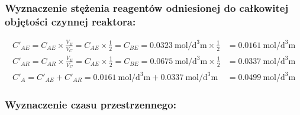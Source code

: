 \documentclass[11pt]{article}
\begin{document}
\subsubsection{Wyznaczenie stężenia reagentów odniesionej do całkowitej objętości czynnej reaktora:}
\begin{align}
{C'}_{AE}=C_{AE}\times\frac{V_E}{V_C}=C_{AE}\times\frac{1}{2}=C_{BE}=\SI{0.0323}{\mole\per\cubic\deci\metre}\times\frac{1}{2}&=\SI{0.0161}{\mole\per\cubic\deci\metre}\\
{C'}_{AR}=C_{AR}\times\frac{V_E}{V_C}=C_{AE}\times\frac{1}{2}=C_{BE}=\SI{0.0675}{\mole\per\cubic\deci\metre}\times\frac{1}{2}&=\SI{0.0337}{\mole\per\cubic\deci\metre}\\
{C'}_A={C'}_{AE}+{C'}_{AR}=\SI{0.0161}{\mole\per\cubic\deci\metre}+\SI{0.0337}{\mole\per\cubic\deci\metre}&=\SI{0.0499}{\mole\per\cubic\deci\metre}
\end{align}
\subsubsection{Wyznaczenie czasu przestrzennego:}
\end{document}

